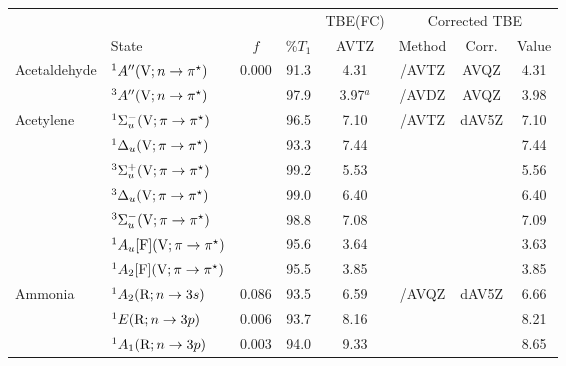 \begin{dfbOptions}
  \initialState[Dinitrogen]{^1\Sigma^+}
\end{dfbOptions}
\begin{tabular}{llcccccc}
                        &		&	&		& TBE(FC)&  \multicolumn{3}{c}{Corrected TBE} \\
                        & State	 & $f$ & \%$T_1$ & 	AVTZ	& Method & Corr.	& Value \\
      Acetaldehyde	&$^1A^{\prime\prime}(\mathrm{V};n \rightarrow \pi^\star)$					& 0.000	&91.3& 4.31		& {\exCI}/AVTZ & AVQZ		&4.31	\\
                        &$^3A^{\prime\prime}(\mathrm{V};n \rightarrow \pi^\star)$					&		&97.9& 3.97$^a$ 	& {\exCI}/AVDZ & AVQZ		&3.98	\\
      Acetylene		&$^1\Sigma_u^- (\mathrm{V};\pi \rightarrow \pi^\star)$ 			&		&96.5& 7.10		& {\exCI}/AVTZ & dAV5Z	 	&7.10 	\\
                        &$^1\Delta_u	(\mathrm{V};\pi \rightarrow \pi^\star)$ 			&		&93.3& 7.44		&			&			&7.44 	\\	
                        &$^3\Sigma_u^+ (\mathrm{V};\pi \rightarrow \pi^\star)$ 			&		&99.2& 5.53		&			&			&5.56 	\\	
                        &$^3\Delta_u	(\mathrm{V};\pi \rightarrow \pi^\star)$ 			&		&99.0& 6.40		&			&			&6.40 	\\	
                        &$^3\Sigma_u^- (\mathrm{V};\pi \rightarrow \pi^\star)$ 			&		&98.8& 7.08		&			&			&7.09 	\\	
                        &$^1A_u [\mathrm{F}]	(\mathrm{V};\pi \rightarrow \pi^\star)$	&		&95.6& 3.64		&			&			&3.63 	\\	
                        &$^1A_2 [\mathrm{F}]	(\mathrm{V};\pi \rightarrow \pi^\star)$	&		&95.5& 3.85		&			&			&3.85	\\	
      Ammonia		&$^1A_2 (\mathrm{R};n \rightarrow 3s)$ 						& 0.086	&93.5& 6.59		&{\exCI}/AVQZ & dAV5Z		&6.66 	\\
                        &$^1E (\mathrm{R};n \rightarrow 3p)$ 							& 0.006	&93.7& 8.16		&			&			&8.21	\\	
                        &$^1A_1 (\mathrm{R};n \rightarrow 3p)$ 						& 0.003	&94.0& 9.33		&			&			&8.65 	\\

\end{tabular}
